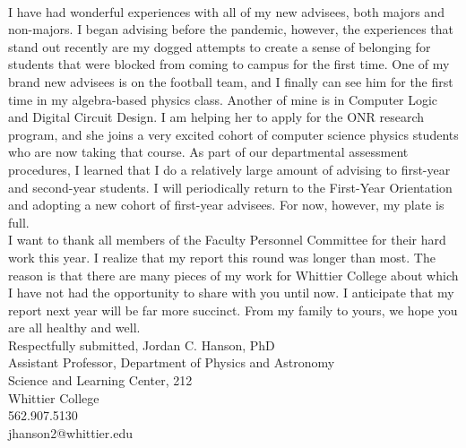 \documentclass[../main.tex]{subfiles}
\begin{document}
\\
\vspace{0.15cm}
I have had wonderful experiences with all of my new advisees, both majors and non-majors.  I began advising before the pandemic, however, the experiences that stand out recently are my dogged attempts to create a sense of belonging for students that were blocked from coming to campus for the first time.  One of my brand new advisees is on the football team, and I finally can see him for the first time in my algebra-based physics class.  Another of mine is in Computer Logic and Digital Circuit Design.  I am helping her to apply for the ONR research program, and she joins a very excited cohort of computer science physics students who are now taking that course.  As part of our departmental assessment procedures, I learned that I do a relatively large amount of advising to first-year and second-year students.  I will periodically return to the First-Year Orientation and adopting a new cohort of first-year advisees.  For now, however, my plate is full.
\\
\vspace{0.15cm}
I want to thank all members of the Faculty Personnel Committee for their hard work this year.  I realize that my report this round was longer than most.  The reason is that there are many pieces of my work for Whittier College about which I have not had the opportunity to share with you until now.  I anticipate that my report next year will be far more succinct.  From my family to yours, we hope you are all healthy and well.
\\
\vspace{0.15cm}
Respectfully submitted,
Jordan C. Hanson, PhD \\
Assistant Professor, Department of Physics and Astronomy \\
Science and Learning Center, 212 \\
Whittier College \\
562.907.5130 \\
jhanson2@whittier.edu
\end{document}
